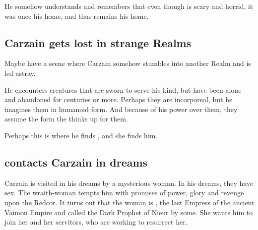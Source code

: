 \begin{garbage}

He somehow understands and remembers that even though \Nyx{} is scary and horrid, it was once his home, and thus remains his home. 










\subsection{Carzain gets lost in strange Realms}
Maybe have a scene where Carzain somehow stumbles into another Realm and is led astray. 

He encounters creatures that are sworn to serve his kind, but have been alone and abandoned for centuries or more. Perhaps they are incorporeal, but he imagines them in humanoid form. And because of his power over them, they assume the form the thinks up for them.

Perhaps this is where he finds \Belzir, and she finds him.







\subsection{\Belzir{} contacts Carzain in dreams}
Carzain is visited in his dreams by a mysterious woman. In his dreams, they have sex. The wraith-woman tempts him with promises of power, glory and revenge upon the Redcor. It turns out that the woman is \Belzir, the last Empress of the ancient Vaimon Empire and called the Dark Prophet of Nieur by some. She wants him to join her and her servitors, who are working to resurrect her. 


\end{garbage}
